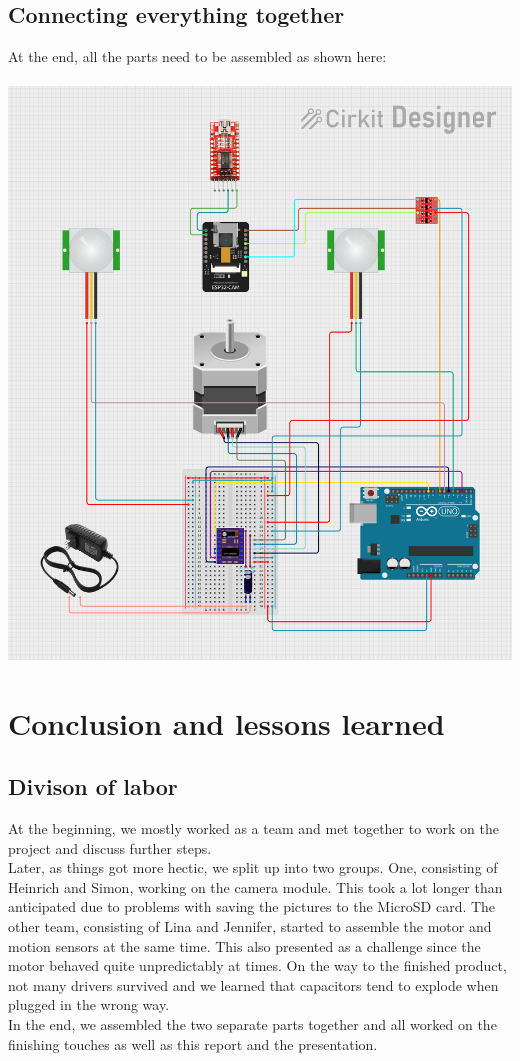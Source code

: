 \documentclass{article}
\begin{document}
\subsection{Connecting everything together} 
At the end, all the parts need to be assembled as shown here:\\
\\
\includegraphics[width=\textwidth]{circuit_image(1).png}

\newpage
\section{Conclusion and lessons learned}
\subsection{Divison of labor}
At the beginning, we mostly worked as a team and met together to work on the project and discuss further steps.\\
Later, as things got more hectic, we split up into two groups. One, consisting of Heinrich and Simon, working on the camera module. This took a lot longer than anticipated due to problems with saving the pictures to the MicroSD card. The other team, consisting of Lina and Jennifer, started to assemble the motor and motion sensors at the same time. This also presented as a challenge since the motor behaved quite unpredictably at times. On the way to the finished product, not many drivers survived and we learned that capacitors tend to explode when plugged in the wrong way.\\
In the end, we assembled the two separate parts together and all worked on the finishing touches as well as this report and the presentation.
\end{document}

